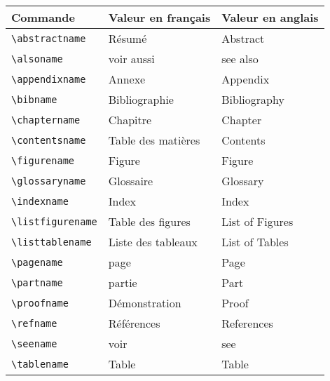 \begin{tabular}{lll}
 Commande                      & Valeur en français & Valeur en anglais \\\toprule
 \lstinline+\abstractname+     & Résumé             & Abstract          \\
 \lstinline+\alsoname+         & voir aussi         & see also          \\
 \lstinline+\appendixname+     & Annexe             & Appendix          \\
 \lstinline+\bibname+          & Bibliographie      & Bibliography      \\
 \lstinline+\chaptername+      & Chapitre           & Chapter           \\
 \lstinline+\contentsname+     & Table des matières & Contents          \\
 \lstinline+\figurename+       & Figure             & Figure            \\
 \lstinline+\glossaryname+     & Glossaire          & Glossary          \\
 \lstinline+\indexname+        & Index              & Index             \\
 \lstinline+\listfigurename+   & Table des figures  & List of Figures   \\
 \lstinline+\listtablename+    & Liste des tableaux & List of Tables    \\
 \lstinline+\pagename+         & page               & Page              \\
 \lstinline+\partname+         & partie             & Part              \\
 \lstinline+\proofname+        & Démonstration      & Proof             \\
 \lstinline+\refname+          & Références         & References        \\
 \lstinline+\seename+          & voir               & see               \\
 \lstinline+\tablename+        & Table              & Table             \\
\end{tabular}
